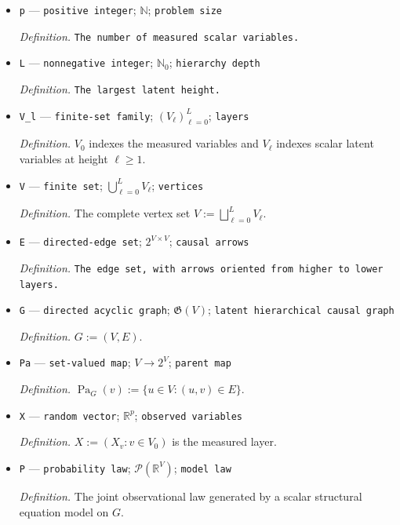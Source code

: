 \documentclass{article}
\begin{document}
\begin{itemize}
  \item \texttt{p} --- \texttt{positive integer}; \(\mathbb N\); \texttt{problem size}
  \par\smallskip\noindent\emph{Definition.} \texttt{The number of measured scalar variables.}
  \item \texttt{L} --- \texttt{nonnegative integer}; \(\mathbb N_0\); \texttt{hierarchy depth}
  \par\smallskip\noindent\emph{Definition.} \texttt{The largest latent height.}
  \item \texttt{V\_\allowbreak{}l} --- \texttt{finite-\allowbreak{}set family}; \((V_\ell)_{\ell=0}^{L}\); \texttt{layers}
  \par\smallskip\noindent\emph{Definition.} \(V_0\) indexes the measured variables and \(V_\ell\) indexes scalar latent variables at height \(\ell\ge 1\).
  \item \texttt{V} --- \texttt{finite set}; \(\bigcup_{\ell=0}^{L}V_\ell\); \texttt{vertices}
  \par\smallskip\noindent\emph{Definition.} The complete vertex set \(V:=\bigsqcup_{\ell=0}^{L}V_\ell\).
  \item \texttt{E} --- \texttt{directed-\allowbreak{}edge set}; \(2^{V\times V}\); \texttt{causal arrows}
  \par\smallskip\noindent\emph{Definition.} \texttt{The edge set,\allowbreak{} with arrows oriented from higher to lower layers.}
  \item \texttt{G} --- \texttt{directed acyclic graph}; \(\mathfrak G(V)\); \texttt{latent hierarchical causal graph}
  \par\smallskip\noindent\emph{Definition.} \(G:=(V,E)\).
  \item \texttt{Pa} --- \texttt{set-\allowbreak{}valued map}; \(V\to 2^V\); \texttt{parent map}
  \par\smallskip\noindent\emph{Definition.} \(\operatorname{Pa}_G(v):=\{u\in V:(u,v)\in E\}\).
  \item \texttt{X} --- \texttt{random vector}; \(\mathbb R^{p}\); \texttt{observed variables}
  \par\smallskip\noindent\emph{Definition.} \(X:=(X_v:v\in V_0)\) is the measured layer.
  \item \texttt{P} --- \texttt{probability law}; \(\mathcal P(\mathbb R^{V})\); \texttt{model law}
  \par\smallskip\noindent\emph{Definition.} The joint observational law generated by a scalar structural equation model on \(G\).

\end{itemize}
\end{document}
